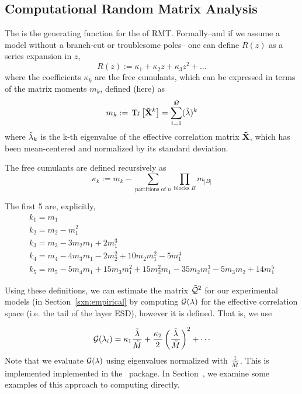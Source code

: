 \subsection{Computational Random Matrix Analysis}
\label{sxn:comp_rmt}
The \RTransform is the generating function for the \emph{\FreeCumulants} of RMT.
Formally--and if we assume a model without a branch-cut or troublesome poles--
one can define $R(z)$ as a series expansion in $z$,
\begin{equation}
  \label{eqn:Rz_expansion}
  R(z) := \kappa_1 + \kappa_2 z + \kappa_3 z^2 + \ldots 
\end{equation}
where the coefficients $\kappa_{k}$ are the free cumulants, which can be expressed
in terms of the matrix moments $m_{k}$\cite{potters_bouchaud_2020}, defined (here) as
\begin{equation}
  \label{eqn:mk_defn}
  m_{k}:=\mbox{}\operatorname{Tr}\left[\tilde{\mathbf{X}}^{k}\right]=\sum_{i=1}^{\tilde{M}}(\tilde{\lambda})^{k}
\end{equation}
where $\tilde{\lambda}_{k}$ is the k-th eigenvalue of the effective correlation matrix $\mathbf{\tilde{\mathbf{X}}}$,
which  has been mean-centered and normalized by its standard deviation.

The free cumulants are defined recursively as
\begin{equation}
  \label{eqn:kappa_defn}
  \kappa_k := m_k - \sum_{\text{partitions of } n} \prod_{\text{blocks } B} m_{|B|} 
\end{equation}

The first 5 \emph{\Cumulants} are, explicitly,
\begin{align}
  \label{eqn:kappa_defn_2}
  k_1 = m_1 \\ \nonumber
  k_2 = m_2 - m_1^2 \\ \nonumber
  k_3 = m_3 - 3 m_2 m_1 + 2 m_1^3 \\ \nonumber
  k_4 = m_4 - 4 m_3 m_1 - 2 m_2^2 + 10 m_2 m_1^2 - 5 m_1^4 \\ \nonumber 
  k_5 = m_5 - 5 m_4 m_1 + 15 m_3 m_1^2 + 15 m_2^2 m_1 - 35 m_2 m_1^3 - 5 m_3 m_2 + 14 m_1^5
\end{align}

Using these definitions, we can estimate the \LayerQuality matrix $\bar{\mathcal{Q}}^{2}$ for our experimental models
(in Section~\ref{sxn:empirical} by computing  $\mathcal{G(\lambda)}$ for the effective correlation space
(i.e. the tail of the layer ESD), however it is defined.  That is, we use

\begin{align}
  \label{eqn:G_lambda_series}
\mathcal{G}(\lambda_{i})=\kappa_{1}\frac{\tilde{\lambda}}{\tilde{M}}+\frac{\kappa_{2}}{2}\left(\dfrac{\tilde{\lambda}}{\tilde{M}}\right)^{2}+\cdots
\end{align}
Note that we evaluate $\mathcal{G(\lambda)}$ using eigenvalues normalized with $\tfrac{1}{\tilde{M}}$.
This is implemented implemented in the ~\WW package.
In Section~, we examine some examples of this approach to computing \LayerQualities directly.

